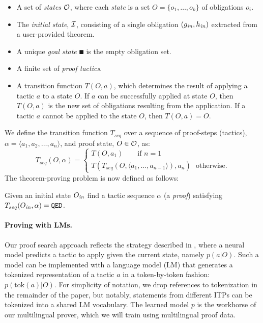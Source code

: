  
\begin{itemize}%

\item 
A set of \emph{states} $\mathcal{O}$, where each \emph{state} is a set $O = \{o_1,\dots, o_k\}$ of obligations $o_i$.

\item 
The \emph{initial state}, $\mathcal{I}$, consisting of a single obligation $(g_{\mathit{in}}, h_{\mathit{in}})$ extracted from a user-provided theorem.

\item A unique \emph{goal state} $\QED$ is the empty obligation set. 

\item A finite set of \emph{proof tactics}.

\item A transition function $T(O, a)$, which determines the result of applying a tactic $a$ to a state $O$. If $a$ can be successfully applied at state $O$, then $T(O, a)$ is the new set of obligations resulting from the application. If a tactic $a$ cannot be applied to the state $O$, then $T(O, a) = O$. 
\end{itemize}
 
We define the transition function $T_{seq}$ over a sequence of proof-steps (tactics), $\alpha = \langle a_1, a_2, \dots, a_n\rangle$, and proof state, $O \in \mathcal{O}$, as:  
$$
T_{seq}(O, \alpha) = 
 \left\{\begin{array}{l}
T(O, a_1) \qquad \textrm{if $n = 1$} \\
T(T_{seq}(O, \langle a_1,\dots, a_{n-1} \rangle), a_n) ~~~ \textrm{otherwise.}
\end{array}
\right. 
$$
The theorem-proving problem is now defined as follows: 
\begin{problem}
Given an initial state $O_{\mathit{in}}$ find a tactic sequence $\alpha$ (a \emph{proof}) satisfying
$T_{seq}(O_{\mathit{in}}, \alpha) = \mathtt{QED}$. 
\end{problem}

\paragraph{Proving with LMs.} Our proof search approach reflects the strategy described in \citep{polu2020generative}, where a neural model predicts a tactic to apply given the current state, namely $p(a|O)$. Such a model can be implemented with a language model (LM) that generates a tokenized representation of a tactic $a$ in a token-by-token fashion: $p(\mathrm{tok}(a) | O)$. For simplicity of notation, we drop references to tokenization in the remainder of the paper, but notably, statements from different ITPs can be tokenized into a shared LM vocabulary. The learned model $p$ is the workhorse of our multilingual prover, which we will train using multilingual proof data.